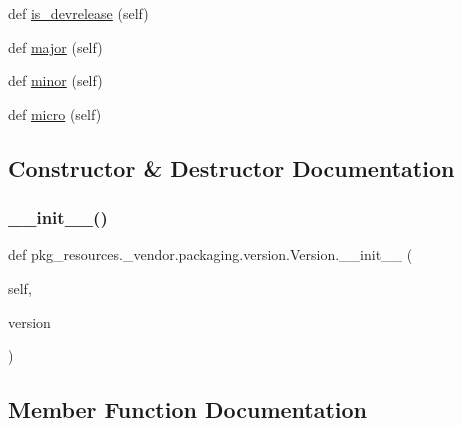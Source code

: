 \begin{DoxyCompactItemize}
\item 
def \hyperlink{classpkg__resources_1_1__vendor_1_1packaging_1_1version_1_1Version_adbb05a7c704dda64adc3f4e5854a5461}{is\+\_\+devrelease} (self)
\item 
def \hyperlink{classpkg__resources_1_1__vendor_1_1packaging_1_1version_1_1Version_a6a1a05c34acc8d7397f174576b292c00}{major} (self)
\item 
def \hyperlink{classpkg__resources_1_1__vendor_1_1packaging_1_1version_1_1Version_a53ab8e475eee93bb8bfc14eeb814bcbd}{minor} (self)
\item 
def \hyperlink{classpkg__resources_1_1__vendor_1_1packaging_1_1version_1_1Version_af29456d01d5100c469fb4aa59057ca6b}{micro} (self)
\end{DoxyCompactItemize}


\subsection{Constructor \& Destructor Documentation}
\mbox{\label{classpkg__resources_1_1__vendor_1_1packaging_1_1version_1_1Version_a97ad57a694c484875decb960f85d5b57}} 
\subsubsection{\texorpdfstring{\+\_\+\+\_\+init\+\_\+\+\_\+()}{\_\_init\_\_()}}
{\footnotesize\ttfamily def pkg\+\_\+resources.\+\_\+vendor.\+packaging.\+version.\+Version.\+\_\+\+\_\+init\+\_\+\+\_\+ (\begin{DoxyParamCaption}\item[{}]{self,  }\item[{}]{version }\end{DoxyParamCaption})}



\subsection{Member Function Documentation}
\mbox{\label{classpkg__resources_1_1__vendor_1_1packaging_1_1version_1_1Version_a89c03b05e97a313b8a4909b6549cea3d}} 
